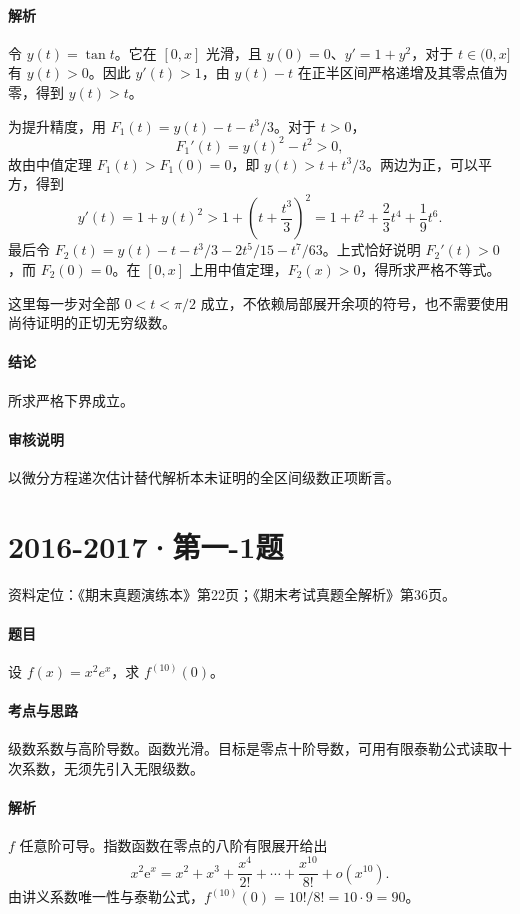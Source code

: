 \documentclass[UTF8,fontset=fandol,12pt,oneside,openany]{ctexrep}
\newcommand{\ee}{\mathrm e}
\theoremstyle{definition}
\begin{document}
\paragraph{解析}
令 $y(t)=\tan t$。它在 $[0,x]$ 光滑，且 $y(0)=0$、$y'=1+y^2$，对于 $t\in(0,x]$ 有 $y(t)>0$。因此 $y'(t)>1$，由 $y(t)-t$ 在正半区间严格递增及其零点值为零，得到 $y(t)>t$。

为提升精度，用 $F_1(t)=y(t)-t-t^3/3$。对于 $t>0$，
\[
F_1'(t)=y(t)^2-t^2>0,
\]
故由中值定理 $F_1(t)>F_1(0)=0$，即 $y(t)>t+t^3/3$。两边为正，可以平方，得到
\[
y'(t)=1+y(t)^2>1+\left(t+\frac{t^3}3\right)^2
=1+t^2+\frac23t^4+\frac19t^6.
\]
最后令 $F_2(t)=y(t)-t-t^3/3-2t^5/15-t^7/63$。上式恰好说明 $F_2'(t)>0$，而 $F_2(0)=0$。在 $[0,x]$ 上用中值定理，$F_2(x)>0$，得所求严格不等式。

这里每一步对全部 $0<t<\pi/2$ 成立，不依赖局部展开余项的符号，也不需要使用尚待证明的正切无穷级数。
\paragraph{结论}
所求严格下界成立。
\paragraph{审核说明}
以微分方程递次估计替代解析本未证明的全区间级数正项断言。

\par\addvspace{18pt}\noindent\begin{minipage}{\linewidth}
\section{2016-2017·第一-1题}
\label{exam:08:q21}
资料定位：《期末真题演练本》第22页；《期末考试真题全解析》第36页。
\paragraph{题目}
设 $f(x)=x^2e^x$，求 $f^{(10)}(0)$。
\end{minipage}\par
\paragraph{考点与思路}
级数系数与高阶导数。函数光滑。目标是零点十阶导数，可用有限泰勒公式读取十次系数，无须先引入无限级数。
\paragraph{解析}
$f$ 任意阶可导。指数函数在零点的八阶有限展开给出
\[
x^2\ee^x=x^2+x^3+\frac{x^4}{2!}+\cdots+\frac{x^{10}}{8!}+o(x^{10}).
\]
由讲义系数唯一性与泰勒公式，$f^{(10)}(0)=10!/8!=10\cdot9=90$。
\end{document}
